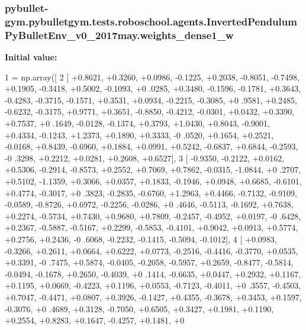 \subsubsection[{\texorpdfstring{weights\+\_\+dense1\+\_\+w}{weights_dense1_w}}]{\setlength{\rightskip}{0pt plus 5cm}pybullet-\/gym.\+pybulletgym.\+tests.\+roboschool.\+agents.\+Inverted\+Pendulum\+Py\+Bullet\+Env\+\_\+v0\+\_\+2017may.\+weights\+\_\+dense1\+\_\+w}\hypertarget{namespacepybullet-gym_1_1pybulletgym_1_1tests_1_1roboschool_1_1agents_1_1_inverted_pendulum_py_bullet_env__v0__2017may_afcb654695ef971ca8158e62d17907ccf}{}\label{namespacepybullet-gym_1_1pybulletgym_1_1tests_1_1roboschool_1_1agents_1_1_inverted_pendulum_py_bullet_env__v0__2017may_afcb654695ef971ca8158e62d17907ccf}
{\bfseries Initial value\+:}
\begin{DoxyCode}
1 = np.array([
2     [ +0.8621, +0.3260, +0.0986, -0.1225, +0.2038, -0.8051, -0.7498, +0.1905, -0.3418, +0.5002, -0.1093, +0
      .0285, +0.3480, -0.1596, -0.1781, +0.3643, -0.4283, -0.3715, -0.1571, +0.3531, +0.0934, -0.2215, -0.3085, +0
      .9581, +0.2485, -0.6232, -0.3175, +0.9771, +0.3651, -0.8850, -0.4212, -0.0301, +0.0432, +0.3390, +0.7537, +0
      .1649, -0.0128, -0.1374, +0.3793, +1.0430, +0.8043, -0.9001, +0.4334, -0.1243, +1.2373, +0.1890, +0.3333, -0
      .0520, +0.1654, +0.2521, -0.0168, +0.8439, -0.6960, +0.1884, +0.0991, +0.5242, -0.6837, +0.6844, -0.2593, -0
      .3298, +0.2212, +0.0281, +0.2608, +0.6527],
3     [ -0.9350, -0.2122, +0.0162, +0.5306, -0.2914, -0.8573, +0.2552, +0.7069, +0.7862, -0.0315, -1.0844, +0
      .2707, +0.5102, -1.1359, +0.3066, +0.0357, +0.1833, -0.1946, +0.0948, +0.6685, -0.6101, +0.4774, -0.3017, +0
      .3823, -0.2835, -0.6760, +1.2963, +0.4466, -0.7132, -0.9109, -0.0589, -0.8726, +0.6972, -0.2256, -0.0286, +0
      .4646, -0.5113, -0.1692, +0.7638, +0.2274, -0.5734, +0.7430, +0.9680, +0.7809, -0.2457, -0.4952, +0.0197, -0
      .6428, +0.2367, -0.5887, -0.5167, +0.2299, -0.5853, -0.4101, +0.9042, +0.0913, +0.5774, +0.2756, +0.2436, -0
      .6068, -0.2232, -0.1415, -0.5094, -0.1012],
4     [ +0.0983, -0.3266, +0.2611, +0.0664, +0.6222, +0.0773, -0.2516, -0.4416, -0.3770, +0.0535, +0.3391, -0
      .7475, +0.5874, -0.0405, -0.2058, -0.5957, +0.2659, -0.8477, -0.5814, -0.0494, -0.1678, +0.2650, -0.4039, +0
      .1414, -0.6635, +0.0447, +0.2932, +0.1167, +0.1195, +0.0669, -0.4223, +0.1196, +0.0553, -0.7123, -0.4011, +0
      .3557, -0.4503, +0.7047, -0.4471, +0.0807, +0.3926, -0.1427, +0.4355, -0.3678, +0.3453, +0.1597, -0.3076, +0
      .4689, +0.3128, -0.7050, +0.6505, +0.3427, +0.1981, +0.1190, +0.2554, +0.8283, +0.1647, -0.4257, +0.1481, +0

\end{DoxyCode}
